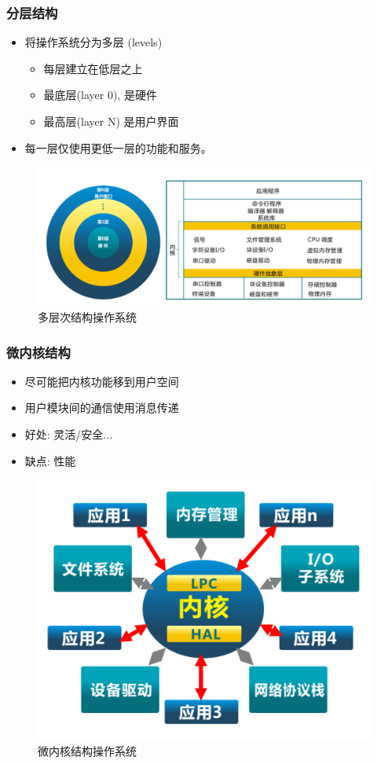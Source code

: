\documentclass[UTF8]{ctexbeamer}
\begin{document}
\begin{frame}
	
	\frametitle{分层结构}
	
	\begin{itemize}
		\item 将操作系统分为多层 (levels)
		\begin{itemize}
			\item 每层建立在低层之上
			\item 最底层(layer 0), 是硬件
			\item 最高层(layer N) 是用户界面
		\end{itemize}
	\item 每一层仅使用更低一层的功能和服务。
	\end{itemize}
	\begin{figure}
		\centering
		\includegraphics[width=0.6\linewidth]{multi-level-os-arch}
		\caption{多层次结构操作系统}
	\end{figure}
	
\end{frame}



\begin{frame}
	
	\frametitle{微内核结构}
	
	\begin{itemize}
		\item 尽可能把内核功能移到用户空间
		\item 用户模块间的通信使用消息传递
		\item 好处: 灵活/安全...
		\item 缺点: 性能
	\end{itemize}
	\begin{figure}
		\centering
		\includegraphics[width=0.6\linewidth]{microkernel-arch}
		\caption{微内核结构操作系统}
	\end{figure}
	
\end{frame}
\end{document}
